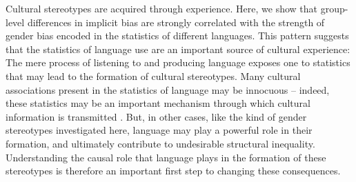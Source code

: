 \documentclass[9pt,twocolumn,twoside,lineno]{pnas-new}
\begin{document}
Cultural stereotypes are acquired through experience. Here, we show that
group-level differences in implicit bias are strongly correlated with
the strength of gender bias encoded in the statistics of different
languages. This pattern suggests that the statistics of language use are
an important source of cultural experience: The mere process of
listening to and producing language exposes one to statistics that may
lead to the formation of cultural stereotypes. Many cultural
associations present in the statistics of language may be innocuous --
indeed, these statistics may be an important mechanism through which
cultural information is transmitted \cite{lupyan2017wordsascues}. But, in
other cases, like the kind of gender stereotypes investigated here,
language may play a powerful role in their formation, and ultimately
contribute to undesirable structural inequality. Understanding the causal role that language plays in the
formation of these stereotypes is therefore an important first step to
changing these consequences.
\end{document}
